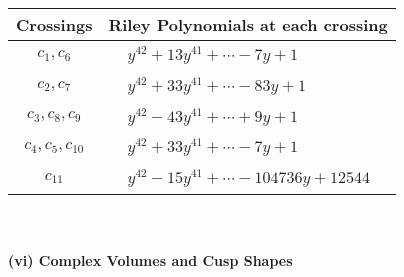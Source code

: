 \documentclass[1p]{elsarticle_modified}
\theoremstyle{definition}
\begin{document}
\begin{tabular}{m{50pt}|m{274pt}}
Crossings & \hspace{64pt}Riley Polynomials at each crossing \\
\hline $$\begin{aligned}c_{1},c_{6}\end{aligned}$$&$\begin{aligned}
&y^{42}+13 y^{41}+\cdots-7 y+1
\end{aligned}$\\
\hline $$\begin{aligned}c_{2},c_{7}\end{aligned}$$&$\begin{aligned}
&y^{42}+33 y^{41}+\cdots-83 y+1
\end{aligned}$\\
\hline $$\begin{aligned}c_{3},c_{8},c_{9}\end{aligned}$$&$\begin{aligned}
&y^{42}-43 y^{41}+\cdots+9 y+1
\end{aligned}$\\
\hline $$\begin{aligned}c_{4},c_{5},c_{10}\end{aligned}$$&$\begin{aligned}
&y^{42}+33 y^{41}+\cdots-7 y+1
\end{aligned}$\\
\hline $$\begin{aligned}c_{11}\end{aligned}$$&$\begin{aligned}
&y^{42}-15 y^{41}+\cdots-104736 y+12544
\end{aligned}$\\
\hline
\end{tabular}\\~\\
\newpage\flushleft \textbf{(vi) Complex Volumes and Cusp Shapes}
\end{document}
